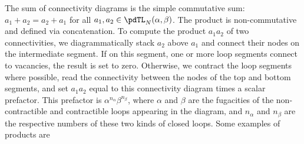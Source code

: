 \documentclass[11pt]{article}
\numberwithin{equation}{section}
\theoremstyle{plain}
\numberwithin{equation}{section}
\begin{document}
The sum of connectivity diagrams is the simple commutative sum: $a_1+a_2 = a_2 + a_1$ for all $a_1, a_2 \in \pdTL_N(\alpha,\beta)$. The product is non-commutative and defined via concatenation. To compute the product $a_1a_2$ of two connectivities, we diagrammatically stack $a_2$ above $a_1$ and connect their nodes on the intermediate segment. If on this segment, one or more loop segments connect to vacancies, the result is set to zero. Otherwise, we contract the loop segments where possible, read the connectivity between the nodes of the top and bottom segments, and set $a_1a_2$ equal to this connectivity diagram times a scalar prefactor. This prefactor is $\alpha^{n_\alpha}\beta^{n_\beta}$, where $\alpha$ and $\beta$ are the fugacities of the non-contractible and contractible loops appearing in the diagram, and $n_\alpha$ and $n_\beta$ are the respective numbers of these two kinds of closed loops. Some examples of products are %
\end{document}

